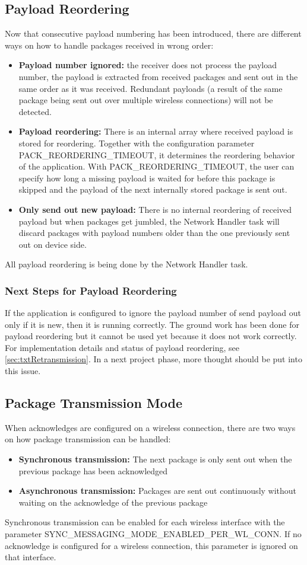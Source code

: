 \subsection{Payload Reordering}
Now that consecutive payload numbering has been introduced, there are different ways on how to handle packages received in wrong order:
\begin{itemize}
    \item \textbf{Payload number ignored:} the receiver does not process the payload number, the payload is extracted from received packages and sent out in the same order as it was received. Redundant payloads (a result of the same package being sent out over multiple wireless connections) will not be detected.
    \item \textbf{Payload reordering:} There is an internal array where received payload is stored for reordering. Together with the configuration parameter PACK\_REORDERING\_TIMEOUT, it determines the reordering behavior of the application. With PACK\_REORDERING\_TIMEOUT, the user can specify how long a missing payload is waited for before this package is skipped and the payload of the next internally stored package is sent out.
    \item \textbf{Only send out new payload:} There is no internal reordering of received payload but when packages get jumbled, the Network Handler task will discard packages with payload numbers older than the one previously sent out on device side.
\end{itemize}
All payload reordering is being done by the Network Handler task.
%
\subsubsection{Next Steps for Payload Reordering}
If the application is configured to ignore the payload number of send payload out only if it is new, then it is running correctly. The ground work has been done for payload reordering but it cannot be used yet because it does not work correctly. For implementation details and status of payload reordering, see \autoref{sec:txtRetransmission}. In a next project phase, more thought should be put into this issue.
%
%
\subsection{Package Transmission Mode} \label{subsec:txtPackageTransmissionMode}
When acknowledges are configured on a wireless connection, there are two ways on how package transmission can be handled:
\begin{itemize}
    \item \textbf{Synchronous transmission:} The next package is only sent out when the previous package has been acknowledged
    \item \textbf{Asynchronous transmission:} Packages are sent out continuously without waiting on the acknowledge of the previous package
\end{itemize}
Synchronous transmission can be enabled for each wireless interface with the parameter SYNC\_MESSAGING\_MODE\_ENABLED\_PER\_WL\_CONN. If no acknowledge is configured for a wireless connection, this parameter is ignored on that interface.
%
